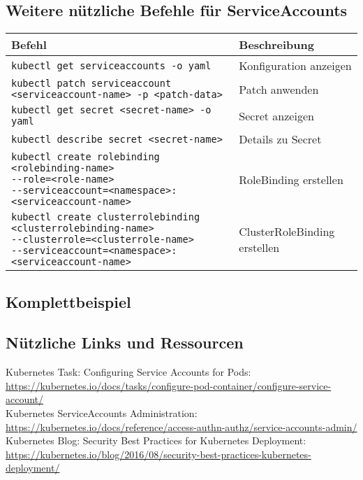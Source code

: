 \subsection{Weitere nützliche Befehle für ServiceAccounts}
\begin{tabular}{|p{0.72\textwidth}|p{0.28\textwidth}|}
\hline
\textbf{Befehl} & \textbf{Beschreibung} \\
\hline
\parbox[t]{\linewidth}{\raggedright\texttt{kubectl get serviceaccounts -o yaml}} & Konfiguration anzeigen \\
\parbox[t]{\linewidth}{\raggedright\texttt{kubectl patch serviceaccount <serviceaccount-name> -p <patch-data>}} & Patch anwenden \\
\parbox[t]{\linewidth}{\raggedright\texttt{kubectl get secret <secret-name> -o yaml}} & Secret anzeigen \\
\parbox[t]{\linewidth}{\raggedright\texttt{kubectl describe secret <secret-name>}} & Details zu Secret \\
\parbox[t]{\linewidth}{\raggedright
\texttt{kubectl create rolebinding <rolebinding-name>}\\
\texttt{{-}{-}role=<role-name>}\\
\texttt{{-}{-}serviceaccount=<namespace>:<serviceaccount-name>}} & RoleBinding erstellen \\
\parbox[t]{\linewidth}{\raggedright
\texttt{kubectl create clusterrolebinding <clusterrolebinding-name>}\\
\texttt{{-}{-}clusterrole=<clusterrole-name>}\\
\texttt{{-}{-}serviceaccount=<namespace>:<serviceaccount-name>}} & ClusterRoleBinding erstellen \\
\hline
\end{tabular}



\newpage
\subsection{Komplettbeispiel}

\subsection*{Nützliche Links und Ressourcen}
Kubernetes Task: Configuring Service Accounts for Pods:\\
\url{https://kubernetes.io/docs/tasks/configure-pod-container/configure-service-account/}\\
Kubernetes ServiceAccounts Administration:\\
\url{https://kubernetes.io/docs/reference/access-authn-authz/service-accounts-admin/}\\
Kubernetes Blog: Security Best Practices for Kubernetes Deployment:\\
\url{https://kubernetes.io/blog/2016/08/security-best-practices-kubernetes-deployment/}\\



